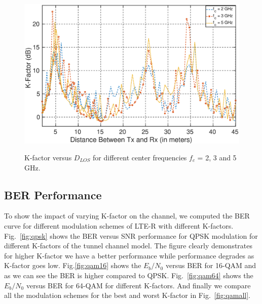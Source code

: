 \begin{figure}[!ht]
\centering
\includegraphics[width=\textwidth,keepaspectratio,height=8cm]{images/Gill/lte_figs/kfactordist.eps} 
\caption{K-factor versus $D_{LOS}$ for different center frequencies $f_c$ = 2, 3 and 5 GHz.}
\label{kfactor}
\end{figure}

\subsection{BER Performance}
To show the impact of varying K-factor on the channel, we computed the BER curve for different modulation schemes of LTE-R with different K-factors. Fig.~\ref{fig:qpsk} shows the BER versus SNR performance for QPSK modulation for different K-factors of the tunnel channel model. The figure clearly demonstrates for higher K-factor we have a better performance while performance degrades as K-factor goes low. Fig.\ref{fig:qam16} shows the $E_b/N_0$ versus BER for 16-QAM and as we can see the BER is higher compared to QPSK. Fig.~\ref{fig:qam64} shows the $E_b/N_0$ versus BER for 64-QAM for different K-factors. And finally we compare all the modulation schemes for the best and worst K-factor in Fig.~\ref{fig:qamall}.

